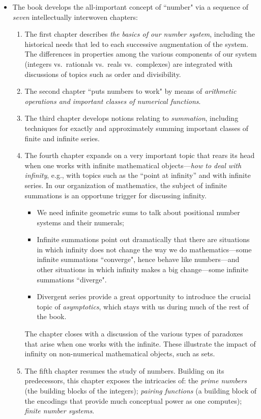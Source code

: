 \documentclass{article}[12pt]
\begin{document}
\begin{itemize}
\begin{itemize}
  \item
The book develops the all-important concept of ``number" via a sequence of {\em seven} intellectually interwoven chapters:
   \begin{enumerate}
   \item       
The first chapter describes {\em the basics of our number system}, including the historical needs that led to each successive augmentation of the system.  The differences in properties among the various components of our system (integers vs.~rationals vs.~reals vs.~complexes) are integrated with discussions of topics such as order and divisibility.
  \item
The second chapter ``puts numbers to work" by means of {\em arithmetic operations and important classes of numerical functions}.
  \item
The third chapter develops notions relating to {\em summation}, including techniques for exactly and approximately summing important classes of finite and infinite series.
  \item
The fourth chapter expands on a very important topic that rears its head when one works with infinite mathematical objects---{\em how to deal with infinity}, e.g., with topics such as the ``point at infinity'' and with infinite series.  In our organization of mathematics, the subject of infinite summations is an opportune trigger for discussing infinity.
     \begin{itemize}
     \item
We need infinite geometric sums to talk about positional number systems and their numerals;
     \item
Infinite summations point out dramatically that there are situations in which infinity does not change the way we do mathematics---some infinite summations ``converge", hence behave like numbers---and other situations in which infinity makes a big change---some infinite summations ``diverge".
     \item
Divergent series provide a great opportunity to introduce the crucial topic of {\em asymptotics}, which stays with us during much of the rest of the book.
     \end{itemize}
The chapter closes with a discussion of the various types of paradoxes that arise when one works with the infinite.  These illustrate the impact of infinity on non-numerical mathematical objects, such as sets.
  \item
The fifth chapter resumes the study of numbers.  Building on its predecessors, this chapter exposes the intricacies of: the {\em prime numbers} (the building blocks of the integers); {\em pairing functions} (a building block of the encodings that provide much conceptual power as one computes); {\em finite number systems}.

\end{enumerate}
\end{itemize}
\end{itemize}
\end{document}
